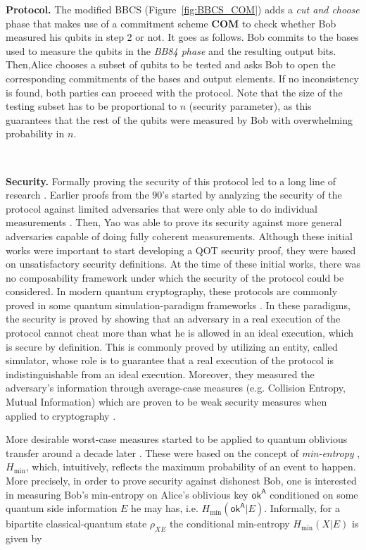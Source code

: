 \noindent\textbf{Protocol.} The modified BBCS (Figure~\ref{fig:BBCS_COM}) adds a \textit{cut and choose} phase that makes use of a commitment scheme \textbf{COM} to check whether Bob measured his qubits in step 2 or not. It goes as follows. Bob commits to the bases used to measure the qubits in the \textit{BB84 phase} and the resulting output bits. Then,Alice chooses a subset of qubits to be tested and asks Bob to open the corresponding commitments of the bases and output elements. If no inconsistency is found, both parties can proceed with the protocol. Note that the size of the testing subset has to be proportional to $n$ (security parameter), as this guarantees that the rest of the qubits were measured by Bob with overwhelming probability in $n$.

\

\noindent\textbf{Security.} Formally proving the security of this protocol led to a long line of research \cite{CK88, BBCS92, MS94, Y95, M96b, CDMS04, FS09, DFLSS09, U10, BF10, GLSV21, BCKM21}. Earlier proofs from the $90$'s started by analyzing the security of the protocol against limited adversaries that were only able to do individual measurements \cite{MS94}. Then, Yao \cite{Y95} was able to prove its security against more general adversaries capable of doing fully coherent measurements. Although these initial works \cite{MS94, Y95, M96b} were important to start developing a QOT security proof, they were based on unsatisfactory security definitions. At the time of these initial works, there was no composability framework \cite{FS09, U10} under which the security of the protocol could be considered. In modern quantum cryptography, these protocols are commonly proved in some quantum simulation-paradigm frameworks \cite{FS09, U10, DFLSS09, KWW12}. In these paradigms, the security is proved by showing that an adversary in a real execution of the protocol cannot cheat more than what he is allowed in an ideal execution, which is secure by definition. This is commonly proved by utilizing an entity, called simulator, whose role is to guarantee that a real execution of the protocol is indistinguishable from an ideal execution. Moreover, they measured the adversary's information through average-case measures (e.g. Collision Entropy, Mutual Information) which are proven to be weak security measures when applied to cryptography \cite{BCC+10, TR11}.

More desirable worst-case measures started to be applied to quantum oblivious transfer around a decade later \cite{R06, DFRSS07}. These were based on the concept of \textit{min-entropy} \cite{BCC+10,TR11}, $H_{\text{min}}$, which, intuitively, reflects the maximum probability of an event to happen. More precisely, in order to prove security against dishonest Bob, one is interested in measuring Bob's min-entropy on Alice's oblivious key $\mathsf{ok}^{\mathsf{A}}$ conditioned on some quantum side information $E$ he may has, i.e. $H_{\text{min}}(\mathsf{ok}^{\mathsf{A}} | E)$. Informally, for a bipartite classical-quantum state $\rho_{X E}$ the conditional min-entropy $H_{\text{min}}(X | E)$ is given by 

